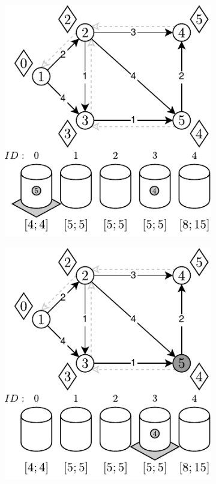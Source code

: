 \begin{figure}[!htbp]
\begin{subfigure}[b]{0.28\textwidth}
		\caption{}
	\end{subfigure}
	\begin{subfigure}[b]{0.28\textwidth}
		\includegraphics[width=\textwidth]{Chapter_II/RADIX-HEAP-NC-Example/e.pdf}
		\caption{}
	\end{subfigure}
	\qquad
	\begin{subfigure}[b]{0.28\textwidth}
		\includegraphics[width=\textwidth]{Chapter_II/RADIX-HEAP-NC-Example/f.pdf}

\end{subfigure}
\end{figure}
